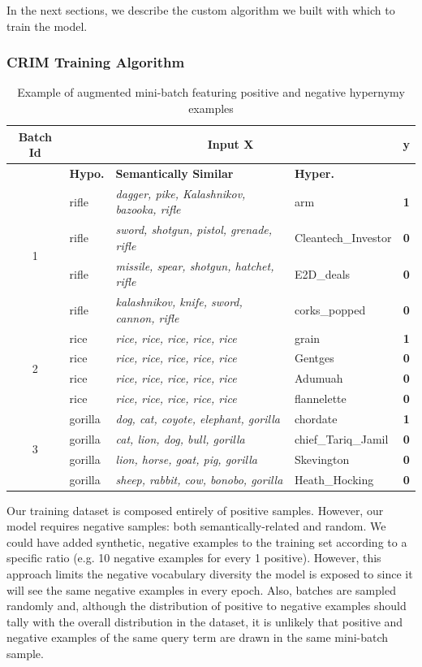 In the next sections, we describe the custom algorithm we built with which to train the model.

\subsubsection{CRIM Training Algorithm} \label{crim_training}
\begin{table}\centering
    \begin{tabular}{@{}clllc@{}} \toprule
    \textbf{Batch Id} & \multicolumn{3}{c}{\textbf{Input X}} & \textbf{y} \\ \midrule
    & \textbf{Hypo.} & \textbf{Semantically Similar} & \textbf{Hyper.} &  \\ 
    \multirow{4}{*}{1} & rifle & \textit{dagger, pike, Kalashnikov, bazooka, rifle} & arm & \textbf{1}\\
    & rifle	& \textit{sword, shotgun, pistol, grenade, rifle} & Cleantech\_Investor & \textbf{0}\\
    & rifle & \textit{missile, spear, shotgun, hatchet, rifle} & E2D\_deals & \textbf{0}\\
    & rifle & \textit{kalashnikov, knife, sword, cannon, rifle} & corks\_popped & \textbf{0}\\ \midrule
    \multirow{4}{*}{2} & rice & \textit{rice, rice, rice, rice, rice} & grain & \textbf{1}\\
    & rice & \textit{rice, rice, rice, rice, rice} & Gentges & \textbf{0}\\
    & rice & \textit{rice, rice, rice, rice, rice} & Adumuah & \textbf{0}\\
    & rice & \textit{rice, rice, rice, rice, rice} & flannelette & \textbf{0}\\ \midrule
    \multirow{4}{*}{3} & gorilla & \textit{dog, cat, coyote, elephant, gorilla} & chordate & \textbf{1}\\
    & gorilla & \textit{cat, lion, dog, bull, gorilla} & chief\_Tariq\_Jamil & \textbf{0}\\
    & gorilla & \textit{lion, horse, goat, pig, gorilla} & Skevington & \textbf{0}\\
    & gorilla & \textit{sheep, rabbit, cow, bonobo, gorilla} & Heath\_Hocking & \textbf{0}\\
    \bottomrule
    \end{tabular}
    \caption{Example of augmented mini-batch featuring positive and negative hypernymy examples}\label{tab:mini_batch_example}
\end{table}
Our training dataset is composed entirely of positive samples.  However, our model requires negative samples: both semantically-related and random.  We could have added synthetic, negative examples to the training set according to a specific ratio (e.g. 10 negative examples for every 1 positive).  However, this approach limits the negative vocabulary diversity the model is exposed to since it will see the same negative examples in every epoch.  Also, batches are sampled randomly and, although the distribution of positive to negative examples should tally with the overall distribution in the dataset, it is unlikely that positive and negative examples of the same query term are drawn in the same mini-batch sample. 

